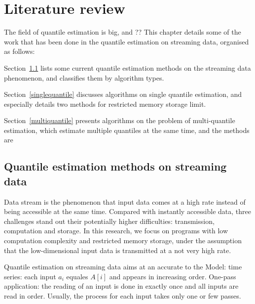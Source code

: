 % 



% 
\chapter{Literature review}
\label{ch: literature_review}

The field of quantile estimation is big, and ??
This chapter details some of the work that has been done in the quantile estimation on streaming data, organised as follows:

Section~\ref{streamingdata} lists some current quantile estimation methods on the streaming data phenomenon, and classifies them by algorithm types. 

Section~\ref{singlequantile} discusses algorithms on single quantile estimation, and especially details two methods for restricted memory storage limit.

Section~\ref{multiquantile} presents algorithms on the problem of multi-quantile estimation, which estimate multiple quantiles at the same time, and the methods are 

   \section{Quantile estimation methods on streaming data}
   \label{streamingdata}
   Data stream is the phenomenon that input data comes at a high rate instead of being accessible at the same time. Compared with instantly accessible data, three challenges stand out their potentially higher difficulties: transmission, computation and storage\cite{muthukrishnanDataStreamsAlgorithms2005}. 
   In this research, we focus on programs with low computation complexity and restricted memory storage, under the assumption that the low-dimensional input data is transmitted at a not very high rate.
   
   Quantile estimation on streaming data aims at an accurate to the 
   Model: time series: each input $a_i$ equales $A[i]$ and appears in increasing order.
   One-pass application: the reading of an input is done in exactly once and all inputs are read in order. Usually, the process for each input takes only one or few passes. 

